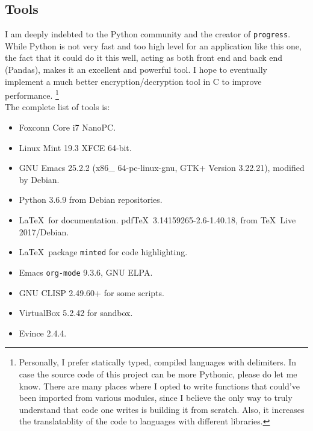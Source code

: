 \documentclass[titlepage]{article}
\begin{document}
\subsection{Tools}
I am deeply indebted to the Python community and the creator of \texttt{progress}. While Python
is not very fast and too high level for an application like this one, the fact that it could do it
this well, acting as both front end and back end (Pandas), makes it an excellent and powerful tool.
I hope to eventually implement a much better encryption/decryption tool in C to improve performance.
\footnote{Personally, I prefer statically typed, compiled languages with delimiters. In case the
source code of this project can be more Pythonic, please do let me know. There are many places where
I opted to write functions that could've been imported from various modules, since I believe the
only way to truly understand that code one writes is building it from scratch. Also, it increases
the translatablity of the code to languages with different libraries.} \\

The complete list of tools is:
\begin{multicols}{3}
\begin{itemize}
\item Foxconn Core i7 NanoPC.
\item Linux Mint 19.3 XFCE 64-bit.
\item GNU Emacs 25.2.2 (x86\_ 64-pc-linux-gnu, GTK+ Version 3.22.21),
  modified by Debian.
\item Python 3.6.9 from Debian repositories.
\item \LaTeX\ for documentation. pdf\TeX\ 3.14159265-2.6-1.40.18, from
  \TeX\ Live 2017/Debian.
\item \LaTeX\ package \texttt{minted} for code highlighting.
\item Emacs \texttt{org-mode} 9.3.6, GNU ELPA.
\item GNU CLISP 2.49.60+ for some scripts.
\item VirtualBox 5.2.42 for sandbox.
\item Evince 2.4.4.
\end{itemize}
\end{multicols}
\end{document}
